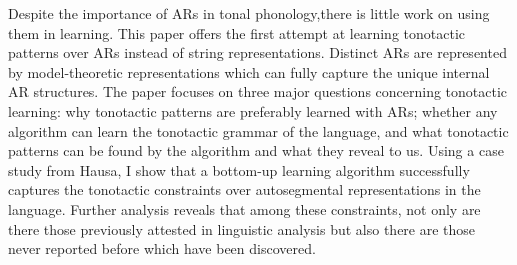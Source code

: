 \documentclass[11pt,letterpaper]{article}
\begin{document}
Despite the importance of ARs in tonal phonology,there is little work on using them in learning. This paper offers the first attempt at learning tonotactic patterns over ARs instead of string representations. Distinct ARs are represented by model-theoretic representations which can fully capture the unique internal AR structures. The paper focuses on three major questions concerning tonotactic learning: why tonotactic patterns are preferably learned with ARs; whether any algorithm can learn the tonotactic grammar of the language, and what tonotactic patterns can be found by the algorithm and what they reveal to us. Using a case study from Hausa, I show that a bottom-up learning algorithm \citep{chandleeLearningPartiallyOrdered2019} successfully captures the tonotactic constraints over autosegmental representations in the language. Further analysis reveals that among these constraints, not only are there those previously attested in linguistic analysis but also there are those never reported before which have been discovered.
 
\end{document}
